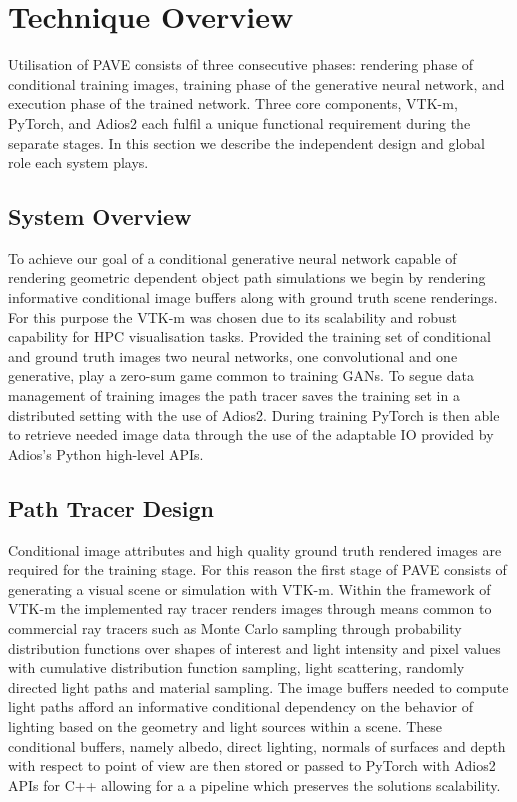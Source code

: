 \documentclass[conference]{IEEEtran}
\begin{document}

\section{Technique Overview}

Utilisation of PAVE consists of three consecutive phases: rendering phase of conditional training images, training phase of the generative neural network, and execution phase of the trained network. Three core components, VTK-m, PyTorch, and Adios2 each fulfil a unique functional requirement during the separate stages. In this section we describe the independent design and global role each system plays.

\subsection{System Overview}
 
To achieve our goal of a conditional generative neural network capable of rendering geometric dependent object path simulations we begin by rendering informative conditional image buffers along with ground truth scene renderings. For this purpose the VTK-m was chosen due to its scalability and robust capability for HPC visualisation tasks. Provided the training set of conditional and ground truth images two neural networks, one convolutional and one generative, play a zero-sum game common to training GANs. To segue data management of training images the path tracer saves the training set in a distributed setting with the use of Adios2. During training PyTorch is then able to retrieve needed image data through the use of the adaptable IO provided by Adios's Python high-level APIs.

\subsection{Path Tracer Design}

Conditional image attributes and high quality ground truth rendered images are required for the training stage. For this reason the first stage of PAVE consists of generating a visual scene or simulation with VTK-m. Within the framework of VTK-m the implemented ray tracer renders images through means common to commercial ray tracers such as Monte Carlo sampling through probability distribution functions over shapes of interest and light intensity and pixel values with cumulative distribution function sampling, light scattering, randomly directed light paths and material sampling. The image buffers needed to compute light paths afford an informative conditional dependency on the behavior of lighting based on the geometry and light sources within a scene. These conditional buffers, namely albedo, direct lighting, normals of surfaces and depth with respect to point of view are then stored or passed to PyTorch with Adios2 APIs for C++ allowing for a a pipeline which preserves the solutions scalability. 
\end{document}
